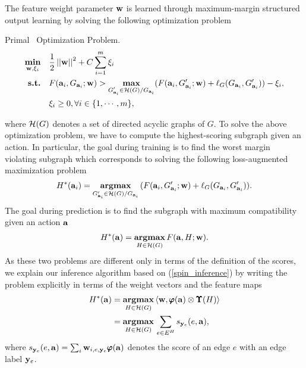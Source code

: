 {%
The feature weight parameter $\mathbf {w}$ is learned through maximum-margin structured output learning by solving the following optimization problem
\begin{definition}{Primal \spin\ Optimization Problem.}
\begin{align*}
	\underset{\mathbf {w},\mathbf{\xi}_i}{\textbf{min}} &\quad \frac{1}{2}\left|\left| \mathbf {w} \right|\right|^2+C\sum_{i=1}^{m}\xi_i\\
	\textbf{s.t.} &\quad F(\mathbf {a}_i,G_{\mathbf {a}_i};\mathbf {w}) > \underset{\substack{G_{\mathbf {a}_i}'\in\mathcal{H}(G)/G_{\mathbf {a}_i}}}{\textbf{max}}(F(\mathbf {a}_i,G_{\mathbf {a}_i}';\mathbf {w})+\mathbf {\ell}_{G}(G_{\mathbf {a}_i},G_{\mathbf {a}_i}')) - \xi_i,\\
	&\quad \xi_i\ge0, \forall i\in\{1,\cdots,m\},
\end{align*}
\end{definition}
\noindent
where $\mathcal{H}(G)$ denotes a set of directed acyclic graphs of $G$.
To solve the above optimization problem, we have to compute the highest-scoring subgraph given an action. 
In particular, the goal during training is to find the worst margin violating subgraph which corresponds to solving the following loss-augmented maximization problem
\begin{align*}
	H^*(\mathbf {a}_i) = \underset{G_{\mathbf {a}_i}'\in\mathcal{H}(G)/G_{\mathbf {a}_i}}{\textbf{argmax}}\, (F(\mathbf {a}_i,G_{\mathbf {a}_i}';\mathbf {w})+\mathbf {\ell}_{G}(G_{\mathbf {a}_i},G_{\mathbf {a}_i}')).
\end{align*}
The goal during prediction is to find the subgraph with maximum compatibility given an action $\mathbf {a}$
\begin{align}
	H^*(\mathbf {a}) = \underset{H\in\mathcal{H}(G)}{\textbf{argmax}}\, F(\mathbf {a},H;\mathbf {w}) \label{spin_inference}.
\end{align}
As these two problems are different only in terms of the definition of the scores, we explain our inference algorithm based on (\ref{spin_inference}) by writing the problem explicitly in terms of the weight vectors and the feature maps
\begin{align}
	H^*(\mathbf {a}) &= \underset{H\in\mathcal{H}(G)}{\textbf{argmax}}\, \langle \mathbf {w}, \pmb \varphi(\mathbf {a})\otimes\pmb \Upsilon(H) \rangle \nonumber \\
	&= \underset{H\in\mathcal{H}(G)}{\textbf{argmax}}\, \sum_{e\in E^H}s_{\mathbf {y}_e}(e,\mathbf {a}), \label{spin_np}
\end{align}
where $s_{\mathbf {y}_e}(e,\mathbf {a}) = \sum_{i}\mathbf {w}_{i,e,\mathbf {y}_e}\pmb \varphi(\mathbf {a})$ denotes the score of an edge $e$ with an edge label $\mathbf {y}_e$.

}

